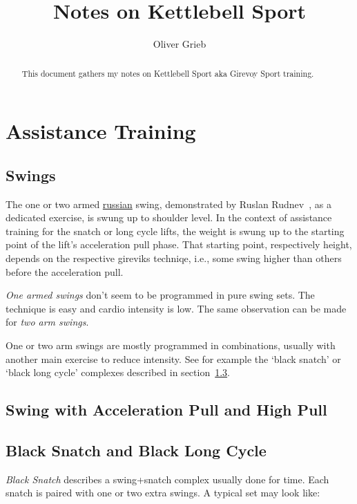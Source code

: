 \documentclass[a4paper,11pt,oneside]{article}
\author{Oliver Grieb}
\title{Notes on Kettlebell Sport}
\begin{document}
\maketitle

\begin{abstract}
This document gathers my notes on Kettlebell Sport aka Girevoy Sport training.
\end{abstract}


\section{Assistance Training}


\subsection{Swings}

The one or two armed \href{https://youtu.be/T2Sx7qi1TcQ?t=167}{russian} swing,  
demonstrated by Ruslan Rudnev~\cite{rkbyten_swings}, as a dedicated exercise, is 
swung up to shoulder level. 
In the context of assistance training for the snatch or long cycle lifts, the weight 
is swung up to the starting point of the lift's acceleration pull phase. 
That starting point, respectively height, depends on the respective gireviks techniqe, 
i.e., some swing higher than others before the acceleration pull.

 
\emph{One armed swings} don't seem to be programmed in pure swing sets. The technique 
is easy and cardio intensity is low. The same observation can be made for 
\emph{two arm swings}.

One or two arm swings are mostly programmed in combinations, usually with another main 
exercise to reduce intensity. See for example the `black snatch' or `black long cycle' 
complexes described in section~\ref{blacksnatchlc}.


\subsection{Swing with Acceleration Pull and High Pull}




\subsection{Black Snatch and Black Long Cycle}
\label{blacksnatchlc}

\emph{Black Snatch} describes a swing+snatch complex usually done for time. Each 
snatch is paired with one or two extra swings. A typical set may look like:
\end{document}
